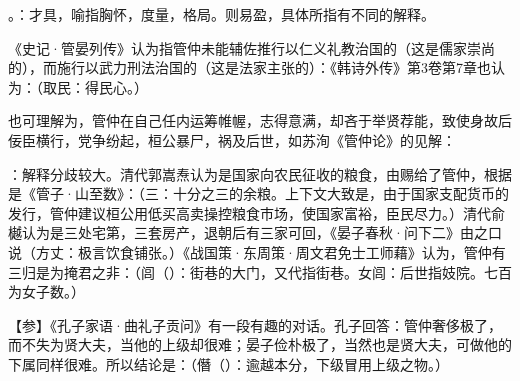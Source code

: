 {
\item {}。：才具，喻指胸怀，度量，格局。则易盈，具体所指有不同的解释。

《史记·管晏列传》认为指管仲未能辅佐推行以仁义礼教治国的（这是儒家崇尚的），而施行以武力刑法治国的（这是法家主张的）：《韩诗外传》第3卷第7章也认为：（取民：得民心。）

也可理解为，管仲在自己任内运筹帷幄，志得意满，却吝于举贤荐能，致使身故后佞臣横行，党争纷起，桓公暴尸，祸及后世，如苏洵《管仲论》的见解：

\item {}：解释分歧较大。清代郭嵩焘认为是国家向农民征收的粮食，由赐给了管仲，根据是《管子·山至数》：（三：十分之三的余粮。上下文大致是，由于国家支配货币的发行，管仲建议桓公用低买高卖操控粮食市场，使国家富裕，臣民尽力。）清代俞樾认为是三处宅第，三套房产，退朝后有三家可回，《晏子春秋·问下二》由之口说（方丈：极言饮食铺张。）《战国策·东周策·周文君免士工师藉》认为，管仲有三归是为掩君之非：（闾（）：街巷的大门，又代指街巷。女闾：后世指妓院。七百为女子数。）

【参】《孔子家语·曲礼子贡问》有一段有趣的对话。孔子回答：管仲奢侈极了，而不失为贤大夫，当他的上级却很难；晏子俭朴极了，当然也是贤大夫，可做他的下属同样很难。所以结论是：（僭（）：逾越本分，下级冒用上级之物。）

}
